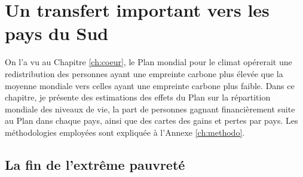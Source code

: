 \documentclass[a5paper,french,openany]{memoir}
\begin{document}




\chapter{Un transfert important vers les pays du Sud\label{ch:effets_distributifs}}

On l'a vu au Chapitre \ref{ch:coeur}, le Plan mondial pour le climat opérerait une redistribution des personnes ayant une empreinte carbone plus élevée que la moyenne mondiale vers celles ayant une empreinte carbone plus faible. Dans ce chapitre, je présente des estimations des effets du Plan sur la répartition mondiale des niveaux de vie, la part de personnes gagnant financièrement suite au Plan dans chaque pays, ainsi que des cartes des gains et pertes par pays. Les méthodologies employées sont expliquée à l'Annexe \ref{ch:methodo}.

\section{La fin de l'extrême pauvreté}\label{sec:fin_pauvrete}
\end{document}
